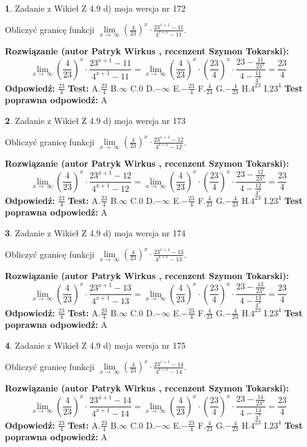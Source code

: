 \documentclass[12pt, a4paper]{article}
\theoremstyle{definition} %
\newtheorem{zad}{}
\newcommand{\zadStart}[1]{\begin{zad}#1\newline}
\newcommand{\zadStop}{\end{zad}}
\newcommand{\rozwStart}[2]{\noindent \textbf{Rozwiązanie (autor #1 , recenzent #2): }\newline}
\newcommand{\rozwStop}{\newline}
\newcommand{\odpStart}{\noindent \textbf{Odpowiedź:}\newline}
\newcommand{\odpStop}{\newline}
\newcommand{\testStart}{\noindent \textbf{Test:}\newline}
\newcommand{\testStop}{\newline}
\newcommand{\kluczStart}{\noindent \textbf{Test poprawna odpowiedź:}\newline}
\newcommand{\kluczStop}{\newline}
\begin{document}
\zadStart{Zadanie z Wikieł Z 4.9 d) moja wersja nr 172}


Obliczyć granicę funkcji  $\lim\limits_{x\to\ \infty}(\frac{4}{23})^{x}\cdot\frac{23^{x+1}-11}{4^{x+1}-11}$.
\zadStop
\rozwStart{Patryk Wirkus}{Szymon Tokarski}
$$\lim\limits_{x\to\ \infty}(\frac{4}{23})^{x}\cdot\frac{23^{x+1}-11}{4^{x+1}-11}=\lim\limits_{x\to\ \infty}(\frac{4}{23})^{x}\cdot(\frac{23}{4})^{x} \cdot \frac{23-\frac{11}{23^{x}}}{4-\frac{11}{4^{x}}} = \frac{23}{4}$$
\rozwStop
\odpStart
$\frac{23}{4}$
\odpStop
\testStart
A.$\frac{23}{4}$ B.$\infty$ C.$0$ D.$-\infty$ E.$-\frac{23}{4}$
F.$\frac{4}{23}$ G.$-\frac{4}{23}$
H.$4^{23}$
I.$23^{4}$
\testStop
\kluczStart
A
\kluczStop



\zadStart{Zadanie z Wikieł Z 4.9 d) moja wersja nr 173}


Obliczyć granicę funkcji  $\lim\limits_{x\to\ \infty}(\frac{4}{23})^{x}\cdot\frac{23^{x+1}-12}{4^{x+1}-12}$.
\zadStop
\rozwStart{Patryk Wirkus}{Szymon Tokarski}
$$\lim\limits_{x\to\ \infty}(\frac{4}{23})^{x}\cdot\frac{23^{x+1}-12}{4^{x+1}-12}=\lim\limits_{x\to\ \infty}(\frac{4}{23})^{x}\cdot(\frac{23}{4})^{x} \cdot \frac{23-\frac{12}{23^{x}}}{4-\frac{12}{4^{x}}} = \frac{23}{4}$$
\rozwStop
\odpStart
$\frac{23}{4}$
\odpStop
\testStart
A.$\frac{23}{4}$ B.$\infty$ C.$0$ D.$-\infty$ E.$-\frac{23}{4}$
F.$\frac{4}{23}$ G.$-\frac{4}{23}$
H.$4^{23}$
I.$23^{4}$
\testStop
\kluczStart
A
\kluczStop



\zadStart{Zadanie z Wikieł Z 4.9 d) moja wersja nr 174}


Obliczyć granicę funkcji  $\lim\limits_{x\to\ \infty}(\frac{4}{23})^{x}\cdot\frac{23^{x+1}-13}{4^{x+1}-13}$.
\zadStop
\rozwStart{Patryk Wirkus}{Szymon Tokarski}
$$\lim\limits_{x\to\ \infty}(\frac{4}{23})^{x}\cdot\frac{23^{x+1}-13}{4^{x+1}-13}=\lim\limits_{x\to\ \infty}(\frac{4}{23})^{x}\cdot(\frac{23}{4})^{x} \cdot \frac{23-\frac{13}{23^{x}}}{4-\frac{13}{4^{x}}} = \frac{23}{4}$$
\rozwStop
\odpStart
$\frac{23}{4}$
\odpStop
\testStart
A.$\frac{23}{4}$ B.$\infty$ C.$0$ D.$-\infty$ E.$-\frac{23}{4}$
F.$\frac{4}{23}$ G.$-\frac{4}{23}$
H.$4^{23}$
I.$23^{4}$
\testStop
\kluczStart
A
\kluczStop



\zadStart{Zadanie z Wikieł Z 4.9 d) moja wersja nr 175}


Obliczyć granicę funkcji  $\lim\limits_{x\to\ \infty}(\frac{4}{23})^{x}\cdot\frac{23^{x+1}-14}{4^{x+1}-14}$.
\zadStop
\rozwStart{Patryk Wirkus}{Szymon Tokarski}
$$\lim\limits_{x\to\ \infty}(\frac{4}{23})^{x}\cdot\frac{23^{x+1}-14}{4^{x+1}-14}=\lim\limits_{x\to\ \infty}(\frac{4}{23})^{x}\cdot(\frac{23}{4})^{x} \cdot \frac{23-\frac{14}{23^{x}}}{4-\frac{14}{4^{x}}} = \frac{23}{4}$$
\rozwStop
\odpStart
$\frac{23}{4}$
\odpStop
\testStart
A.$\frac{23}{4}$ B.$\infty$ C.$0$ D.$-\infty$ E.$-\frac{23}{4}$
F.$\frac{4}{23}$ G.$-\frac{4}{23}$
H.$4^{23}$
I.$23^{4}$
\testStop
\kluczStart
A
\kluczStop
\end{document}
